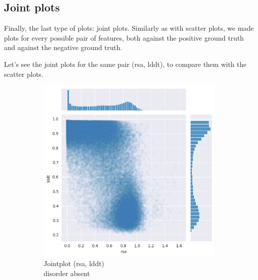 \subsection{Joint plots}

Finally, the last type of plots: joint plots. Similarly as with scatter plots, we made plots for every possible pair of features, both against the positive ground truth and against the negative ground truth.

Let's see the joint plots for the same pair (rsa, lddt), to compare them with the scatter plots.

\begin{figure}[h!]
    \begin{subfigure}{0.5\linewidth}
        \includegraphics[width=\linewidth]{res/analysis/plots/dis0-jointplot_rsa-lddt.png}
        \caption{Jointplot (rsa, lddt)\\disorder absent}
    \end{subfigure}
    \begin{subfigure}{0.5\linewidth}

\end{subfigure}
\end{figure}
